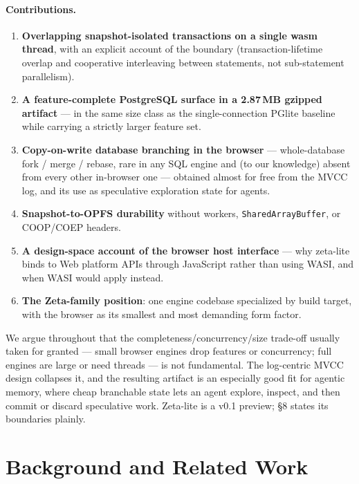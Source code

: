 \documentclass[11pt]{article}
\begin{document}
\paragraph{Contributions.}
\begin{enumerate}[leftmargin=1.5em,itemsep=0.25em]
\item \textbf{Overlapping snapshot-isolated transactions on a single wasm thread},
with an explicit account of the boundary (transaction-lifetime overlap and
cooperative interleaving between statements, not sub-statement parallelism).
\item \textbf{A feature-complete PostgreSQL surface in a 2.87\,MB gzipped
artifact} --- in the same size class as the single-connection PGlite baseline
while carrying a strictly larger feature set.
\item \textbf{Copy-on-write database branching in the browser} --- whole-database
fork / merge / rebase, rare in any SQL engine and (to our knowledge) absent from
every other in-browser one --- obtained almost for free from the MVCC log, and its
use as speculative exploration state for agents.
\item \textbf{Snapshot-to-OPFS durability} without workers,
\texttt{SharedArrayBuffer}, or COOP/COEP headers.
\item \textbf{A design-space account of the browser host interface} --- why
zeta-lite binds to Web platform APIs through JavaScript rather than using WASI, and
when WASI would apply instead.
\item \textbf{The Zeta-family position}: one engine codebase specialized by build
target, with the browser as its smallest and most demanding form factor.
\end{enumerate}

We argue throughout that the completeness/concurrency/size trade-off usually taken
for granted --- small browser engines drop features or concurrency; full engines
are large or need threads --- is not fundamental. The log-centric MVCC design
collapses it, and the resulting artifact is an especially good fit for agentic
memory, where cheap branchable state lets an agent explore, inspect, and then
commit or discard speculative work. Zeta-lite is a v0.1 preview; \S8 states its
boundaries plainly.

\section{Background and Related Work}
\end{document}
